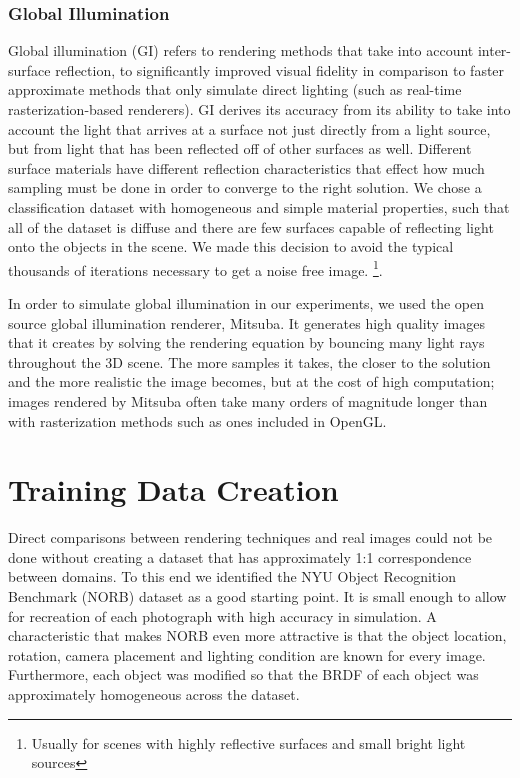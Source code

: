 \documentclass[10pt,twocolumn,letterpaper]{article}
\begin{document}
\subsubsection{Global Illumination}\label{mitsuba_section}

Global illumination (GI) refers to rendering methods that take into account inter-surface reflection, to significantly improved visual fidelity in comparison to faster approximate methods that only simulate direct lighting (such as real-time rasterization-based renderers).  GI derives its accuracy from its ability to take into account the light that arrives at a surface not just directly from a light source, but from light that has been reflected off of other surfaces as well. Different surface materials have different reflection characteristics that effect how much sampling must be done in order to converge to the right solution. We chose a classification dataset with homogeneous and simple material properties, such that all of the dataset is diffuse and there are few surfaces capable of reflecting light onto the objects in the scene. We made this decision to avoid the typical thousands of iterations necessary to get a noise free image. \footnote{Usually for scenes with highly reflective surfaces and small bright light sources}.

In order to simulate global illumination in our experiments, we used the open source global illumination renderer, Mitsuba.  It generates high quality images that it creates by solving the rendering equation by bouncing many light rays throughout the 3D scene.  The more samples it takes, the closer to the solution and the more realistic the image becomes, but at the cost of high computation; images rendered by Mitsuba often take many orders of magnitude longer than with rasterization methods such as ones included in OpenGL.  

\section{Training Data Creation}
Direct comparisons between rendering techniques and real images could not be done without creating a dataset that has approximately 1:1 correspondence between domains.  To this end we identified the NYU Object Recognition Benchmark (NORB) dataset \cite{LeCun:2004:LMG:1896300.1896315} as a good starting point. It is small enough to allow for recreation of each photograph with high accuracy in simulation.  A characteristic that makes NORB even more attractive is that the object location, rotation, camera placement and lighting condition are known for every image. Furthermore, each object was modified so that the BRDF of each object was approximately homogeneous across the dataset.
\end{document}
